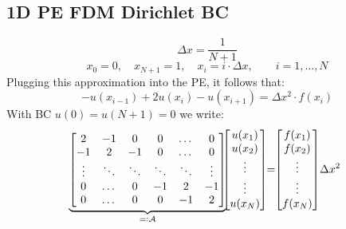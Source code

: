\subsection{1D PE FDM \texorpdfstring{\hfill}{-} Dirichlet BC}\label{subsec::1DPEFDM}
    \vspace{-0.5em}
    $$
        \Delta x = \frac{1}{N+1}
    $$
    $$
        x_0 = 0, \quad x_{N+1} = 1, \quad x_i = i \cdot \Delta x, \qquad i = 1, \dots ,N
    $$
    Plugging this approximation into the PE, it follows that:
    $$
        - u(x_{i-1}) + 2 u(x_i) - u(x_{i+1}) = \Delta x^2 \cdot f(x_i)
    $$
    With BC $u(0) = u(N+1) = 0$ we write:
    $$
        \!\!\!
        \underbrace{\begin{bmatrix}
            2 & -1 &  0 & 0 & \dots & 0 \\
            -1 &  2 & -1 & 0 & \dots & 0 \\
            \vdots & \ddots & \ddots & \ddots & \ddots & \vdots \\
            0 & \dots & 0 & -1 &  2 & -1 \\
            0 & \dots & 0 & 0 &  -1 &  2 
        \end{bmatrix}}_{ =\vcentcolon \mathcal{A}}
        \!\!\!
        \begin{bmatrix}
            u(x_1) \\ u(x_2) \\ \vdots \\ \vdots\\ u(x_N)
        \end{bmatrix}
        \!\!
        = 
        \!\!
        \begin{bmatrix}
            f(x_1) \\ f(x_2) \\ \vdots \\ \vdots\\ f(x_N)
        \end{bmatrix}
        \!
        \Delta x^2
    $$
    \vspace{-0.8em}